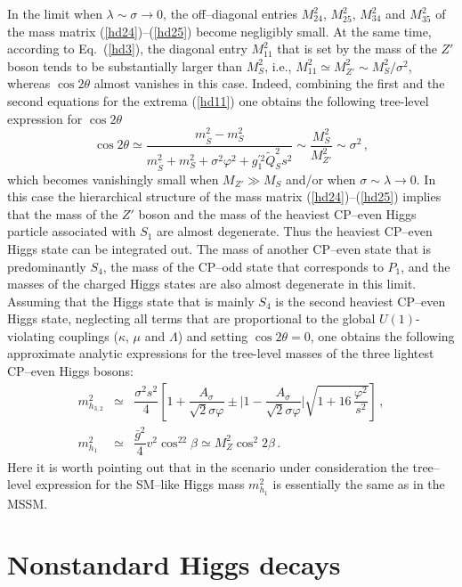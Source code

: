 \documentclass[12pt,a4paper]{article}
\newcommand{\be}{\begin{equation}}
\newcommand{\ee}{\end{equation}}
\newcommand{\ba}{\begin{array}}
\newcommand{\ea}{\end{array}}
\begin{document}
In the limit when $\lambda \sim \sigma \to 0 $, the off--diagonal entries $M_{24}^2$, $M_{25}^2$, $M_{34}^2$
and $M_{35}^2$ of the mass matrix (\ref{hd24})--(\ref{hd25}) become negligibly small.
 At the same time,
according to Eq.~(\ref{hd3}), the diagonal entry $M_{11}^2$ that is set by the mass 
of the $Z'$ boson tends
to be substantially larger than $M_S^2$, i.e., $M_{11}^2\simeq M_{Z'}^2 \sim M_S^2/\sigma^2$, whereas
$\cos 2\theta$ almost vanishes in this case. Indeed, combining the first and the second equations for the extrema
(\ref{hd11}) one obtains the following tree-level expression for $\cos 2\theta$
\be
\cos 2\theta \simeq
\dfrac{m_{\overline{S}}^2-m_{S}^2}{m_{\overline{S}}^2+m_S^2+\sigma^2\varphi^2+g^{'2}_1 \tilde{Q}_S^2 s^2}
\sim \dfrac{M_S^2}{M_{Z'}^2}\sim \sigma^2\,,
\label{hd27}
\ee
which becomes vanishingly small when $M_{Z'}\gg M_S$ and/or when
$\sigma\sim \lambda\to 0$.
In this case the  hierarchical structure
of the mass matrix (\ref{hd24})--(\ref{hd25}) implies that the mass of the $Z'$ boson 
and the mass of the heaviest CP--even Higgs particle
associated with $S_1$ are almost degenerate. Thus the heaviest CP--even Higgs state can be integrated out. The mass of
another CP--even state that is predominantly $S_4$, the mass of the
CP--odd state that corresponds to $P_1$, and the masses of the charged Higgs states
are also almost degenerate in this limit. Assuming that the Higgs state that
 is mainly $S_4$ is the second heaviest CP--even Higgs
state, neglecting all terms that are proportional to the global 
$U(1)$-violating couplings ($\kappa$, $\mu$ 
and $\Lambda$) and setting $\cos 2\theta=0$, one obtains the following approximate analytic expressions for the tree-level
masses of the three lightest CP--even Higgs bosons:
\be
\ba{lcl}
m_{h_{3,2}}^2 & \simeq & \dfrac{\sigma^2 s^2}{4}\left[1+\dfrac{A_{\sigma}}{\sqrt{2}\sigma \varphi} \pm
\biggl|1 - \dfrac{A_{\sigma}}{\sqrt{2}\sigma \varphi}\biggr|\sqrt{1+16\,\dfrac{\varphi^2}{s^2}}\right]\,,\\[2mm]
m_{h_{1}}^2 & \simeq & \dfrac{\bar{g}^2}{4}v^2\cos^22\beta\simeq M_{Z}^2 \cos^2 2\beta\,.
\ea
\label{hd28}
\ee
Here it is worth pointing out that in the scenario under consideration the tree--level expression for the SM--like Higgs mass
$m_{h_{1}}^2$ is essentially the same as in the MSSM.



\section{Nonstandard Higgs decays}
\end{document}
